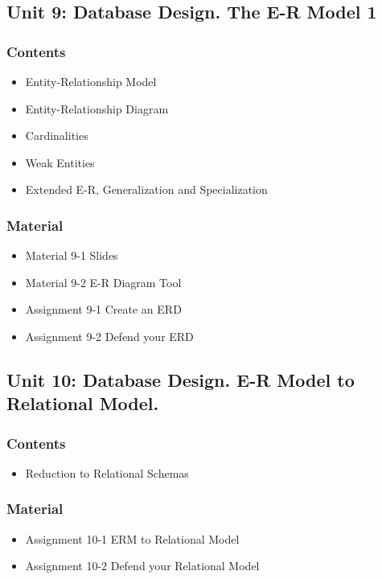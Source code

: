 \documentclass[catalan, a4paper, 12pt, titlepage]{article}
\begin{document}
  \subsection{Unit 9: Database Design. The E-R Model 1}

  \subsubsection{Contents}
  \begin{itemize}
	  \item Entity-Relationship Model
	  \item Entity-Relationship Diagram
	  \item Cardinalities
	  \item Weak Entities
	  \item Extended E-R, Generalization and Specialization
  \end{itemize}

  \subsubsection{Material}
  \begin{itemize}
	  \item Material 9-1 Slides
	  \item Material 9-2 E-R Diagram Tool
	  \item Assignment 9-1 Create an ERD
	  \item Assignment 9-2 Defend your ERD
  \end{itemize}


  \subsection{Unit 10: Database Design. E-R Model to Relational Model.}

  \subsubsection{Contents}
  \begin{itemize}
	\item Reduction to Relational Schemas
  \end{itemize}

  \subsubsection{Material}
  \begin{itemize}
	  \item Assignment 10-1 ERM to Relational Model
	  \item Assignment 10-2 Defend your Relational Model
  \end{itemize}
\end{document}
